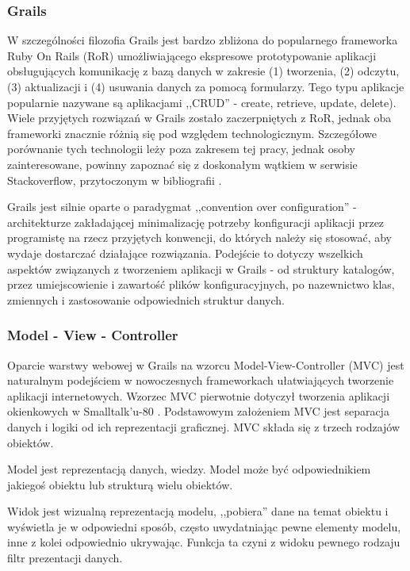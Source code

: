     \subsubsection{Grails}

    W szczególności filozofia Grails jest bardzo zbliżona do popularnego frameworka Ruby On Rails (RoR) umożliwiającego ekspresowe prototypowanie aplikacji obsługujących komunikację z bazą danych w zakresie (1) tworzenia, (2) odczytu, (3) aktualizacji i (4) usuwania danych za pomocą formularzy. Tego typu aplikacje popularnie nazywane są aplikacjami ,,CRUD'' - create, retrieve, update, delete). Wiele przyjętych rozwiązań w Grails zostało zaczerpniętych z RoR, jednak oba frameworki znacznie różnią się pod względem technologicznym. Szczegółowe porównanie tych technologii leży poza zakresem tej pracy, jednak osoby zainteresowane, powinny zapoznać się z doskonałym wątkiem w serwisie Stackoverflow, przytoczonym w bibliografii \cite{RailsGr}.


    Grails jest silnie oparte o paradygmat ,,convention over configuration'' - architekturze zakładającej minimalizację potrzeby konfiguracji aplikacji przez programistę na rzecz przyjętych konwencji, do których należy się stosować, aby wydaje dostarczać działające rozwiązania. Podejście to dotyczy wszelkich aspektów związanych z tworzeniem aplikacji w Grails - od struktury katalogów, przez umiejscowienie i zawartość plików konfiguracyjnych, po nazewnictwo klas, zmiennych i zastosowanie odpowiednich struktur danych. 

    \subsubsection{Model - View - Controller}

    Oparcie warstwy webowej w Grails na wzorcu Model-View-Controller (MVC) jest naturalnym podejściem w nowoczesnych frameworkach ułatwiających tworzenie aplikacji internetowych. Wzorzec MVC \cite{GoF} pierwotnie dotyczył tworzenia aplikacji okienkowych w Smalltalk'u-80 \cite{coad93}. Podstawowym założeniem MVC jest separacja danych i logiki od ich reprezentacji graficznej. MVC składa się z trzech rodzajów obiektów. 
  
    Model jest reprezentacją danych, wiedzy. Model może być odpowiednikiem jakiegoś obiektu lub strukturą wielu obiektów. 

    Widok jest wizualną reprezentacją modelu, ,,pobiera'' dane na temat obiektu i wyświetla je w odpowiedni sposób, często uwydatniając pewne elementy modelu, inne z kolei odpowiednio ukrywając. Funkcja ta czyni z widoku pewnego rodzaju filtr prezentacji danych. 

